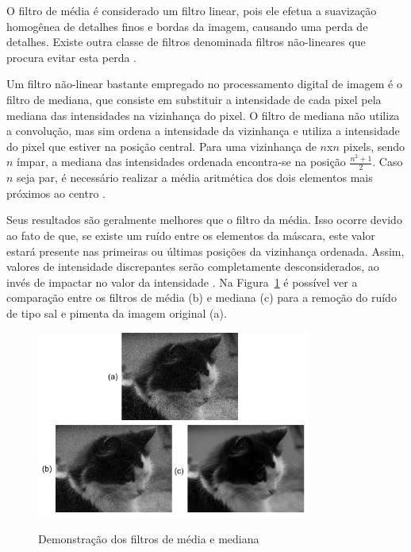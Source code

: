 \documentclass[12pt,oneside,a4paper,english,french,spanish,brazil,]{abntex2}
\begin{document}
O filtro de média é considerado um filtro linear, pois ele efetua a suavização homogênea de detalhes finos e bordas da imagem, causando uma perda de detalhes. Existe outra classe de filtros denominada filtros não-lineares que procura evitar esta perda \cite{pedrini:2008}.

Um filtro não-linear bastante empregado no processamento digital de imagem é o filtro de mediana, que consiste em substituir a intensidade de cada pixel pela mediana das intensidades na vizinhança do pixel. O filtro de mediana não utiliza a convolução, mas sim ordena a intensidade da vizinhança e utiliza a intensidade do pixel que estiver na posição central. Para uma vizinhança de \(n\)x\(n\) pixels, sendo \(n\) ímpar, a mediana das intensidades ordenada encontra-se na posição \(\frac{n^2+1}{2}\). Caso \(n\) seja par, é necessário realizar a média aritmética dos dois elementos mais próximos ao centro \cite{gonzalez:2012}. 

Seus resultados são geralmente melhores que o filtro da média. Isso ocorre devido ao fato de que, se existe um ruído entre os elementos da máscara, este valor estará presente nas primeiras ou últimas posições da vizinhança ordenada. Assim, valores de intensidade discrepantes serão completamente desconsiderados, ao invés de impactar no valor da intensidade \cite{conci:2003}. Na Figura~\ref{fig:PDI_Media_Mediana} é possível ver a comparação entre os filtros de média (b) e mediana (c) para a remoção do ruído de tipo sal e pimenta da imagem original (a).

\begin{figure}[ht]
\centering
\caption{ Demonstração dos filtros de média e mediana}
\includegraphics[width=0.8\textwidth]{imagens/PDI_Media_Mediana.pdf}
\sourceAuthor
\label{fig:PDI_Media_Mediana}
\end{figure}
\end{document}
